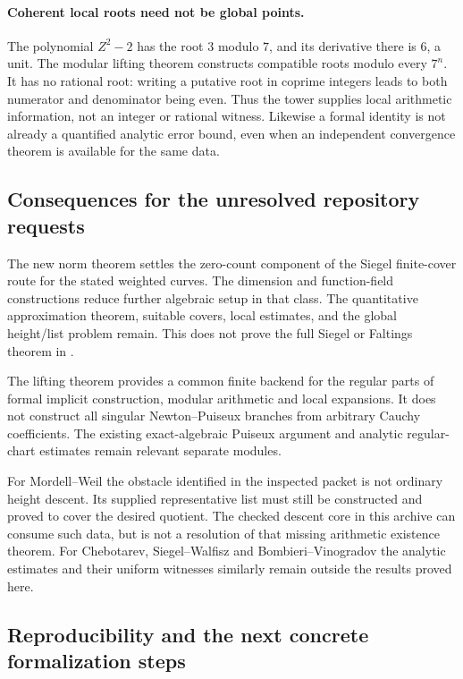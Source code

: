 \paragraph{Coherent local roots need not be global points.}
The polynomial \(Z^2-2\) has the root \(3\) modulo \(7\), and its
derivative there is \(6\), a unit. The modular lifting theorem constructs
compatible roots modulo every \(7^n\). It has no rational root: writing
a putative root in coprime integers leads to both numerator and denominator
being even. Thus the tower supplies local arithmetic information, not an
integer or rational witness. Likewise a formal identity is not already
a quantified analytic error bound, even when an independent convergence
theorem is available for the same data.

\subsection{Consequences for the unresolved repository requests}

The new norm theorem settles the zero-count component of the Siegel
finite-cover route for the stated weighted curves. The dimension and
function-field constructions reduce further algebraic setup in that class.
The quantitative approximation theorem, suitable covers, local estimates,
and the global height/list problem remain. This does not prove the full
Siegel or Faltings theorem in \ipra.

The lifting theorem provides a common finite backend for the regular
parts of formal implicit construction, modular arithmetic and local
expansions. It does not construct all singular Newton--Puiseux branches
from arbitrary Cauchy coefficients. The existing exact-algebraic Puiseux
argument and analytic regular-chart estimates remain relevant separate
modules.

For Mordell--Weil the obstacle identified in the inspected packet is not
ordinary height descent. Its supplied representative list must still be
constructed and proved to cover the desired quotient. The checked descent
core in this archive can consume such data, but is not a resolution of
that missing arithmetic existence theorem. For Chebotarev,
Siegel--Walfisz and Bombieri--Vinogradov the analytic estimates and their
uniform witnesses similarly remain outside the results proved here.

\subsection{Reproducibility and the next concrete formalization steps}

